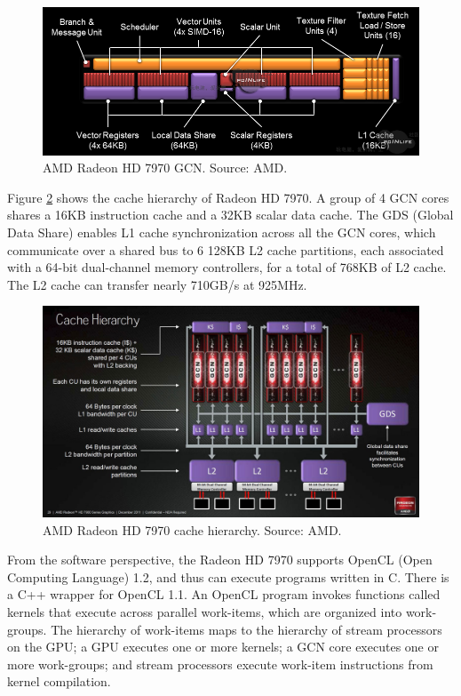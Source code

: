 \begin{figure}
\centering
\includegraphics[width=\textwidth]{GPU/RadeonHD7970GCN.png}
\caption{AMD Radeon HD 7970 GCN. Source: AMD.}
\label{GPU:RadeonHD7970GCN}
\end{figure}

Figure \ref{GPU:RadeonHD7970CacheHierarchy} shows the cache hierarchy of Radeon HD 7970. A group of 4 GCN cores shares a 16KB instruction cache and a 32KB scalar data cache. The GDS (Global Data Share) enables L1 cache synchronization across all the GCN cores, which communicate over a shared bus to 6 128KB L2 cache partitions, each associated with a 64-bit dual-channel memory controllers, for a total of 768KB of L2 cache. The L2 cache can transfer nearly 710GB/s at 925MHz.

\begin{figure}
\centering
\includegraphics[width=\textwidth]{GPU/RadeonHD7970CacheHierarchy.jpg}
\caption{AMD Radeon HD 7970 cache hierarchy. Source: AMD.}
\label{GPU:RadeonHD7970CacheHierarchy}
\end{figure}

From the software perspective, the Radeon HD 7970 supports OpenCL (Open Computing Language) 1.2, and thus can execute programs written in C. There is a C++ wrapper for OpenCL 1.1. An OpenCL program invokes functions called kernels that execute across parallel work-items, which are organized into work-groups. The hierarchy of work-items maps to the hierarchy of stream processors on the GPU; a GPU executes one or more kernels; a GCN core executes one or more work-groups; and stream processors execute work-item instructions from kernel compilation.

